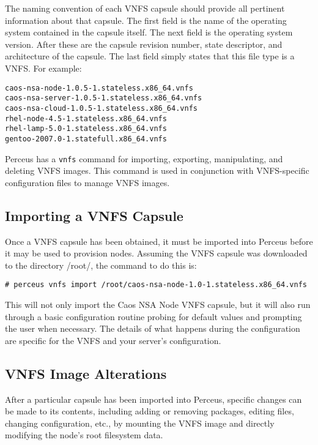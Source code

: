 \documentclass[10pt,letterpaper]{report}
\begin{document}
The naming convention of each VNFS capsule should provide all pertinent
information about that capsule.  The first field is the name of the operating
system contained in the capsule itself.  The next field is the operating
system version.  After these are the capsule revision number, state
descriptor, and architecture of the capsule.  The last field simply states
that this file type is a VNFS.  For example:

\begin{verbatim}
caos-nsa-node-1.0.5-1.stateless.x86_64.vnfs
caos-nsa-server-1.0.5-1.stateless.x86_64.vnfs
caos-nsa-cloud-1.0.5-1.stateless.x86_64.vnfs
rhel-node-4.5-1.stateless.x86_64.vnfs
rhel-lamp-5.0-1.stateless.x86_64.vnfs
gentoo-2007.0-1.statefull.x86_64.vnfs
\end{verbatim}

Perceus has a {\tt vnfs} command for importing, exporting, manipulating, and
deleting VNFS images.  This command is used in conjunction with VNFS-specific
configuration files to manage VNFS images.

\subsection{Importing a VNFS Capsule}

Once a VNFS capsule has been obtained, it must be imported into Perceus before
it may be used to provision nodes.  Assuming the VNFS capsule was downloaded
to the directory /root/, the command to do this is:

\begin{verbatim}
# perceus vnfs import /root/caos-nsa-node-1.0-1.stateless.x86_64.vnfs
\end{verbatim}

This will not only import the Caos NSA Node VNFS capsule, but it will also run
through a basic configuration routine probing for default values and prompting
the user when necessary.  The details of what happens during the configuration
are specific for the VNFS and your server's configuration.

\subsection{VNFS Image Alterations}

After a particular capsule has been imported into Perceus, specific changes
can be made to its contents, including adding or removing packages, editing
files, changing configuration, etc., by mounting the VNFS image and directly
modifying the node's root filesystem data.
\end{document}
